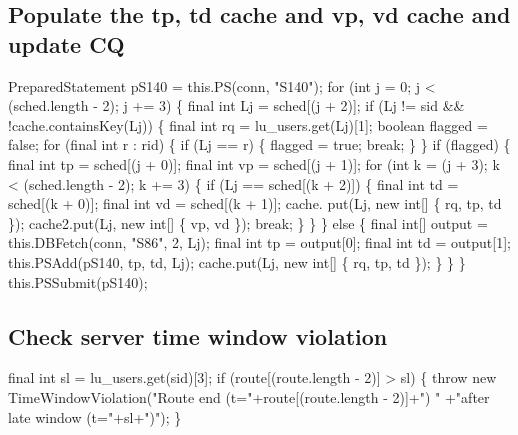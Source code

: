 \subsection{Populate the tp, td cache and vp, vd cache and update CQ}
\nwenddocs{}\endmoddef{}
PreparedStatement pS140 = this.PS(conn, "S140");
for (int j = 0; j < (sched.length - 2); j += 3) \{
  final int Lj = sched[(j + 2)];
  if (Lj != sid && !cache.containsKey(Lj)) \{
    final int rq = lu_users.get(Lj)[1];
    boolean flagged = false;
    for (final int r : rid) \{
      if (Lj == r) \{
        flagged = true;
        break;
      \}
    \}
    if (flagged) \{
      final int tp = sched[(j + 0)];
      final int vp = sched[(j + 1)];
      for (int k = (j + 3); k < (sched.length - 2); k += 3) \{
        if (Lj == sched[(k + 2)]) \{
          final int td = sched[(k + 0)];
          final int vd = sched[(k + 1)];
          cache. put(Lj, new int[] \{ rq, tp, td \});
          cache2.put(Lj, new int[] \{ vp, vd \});
          break;
        \}
      \}
    \} else \{
      final int[] output = this.DBFetch(conn, "S86", 2, Lj);
      final int tp = output[0];
      final int td = output[1];
      this.PSAdd(pS140, tp, td, Lj);
      cache.put(Lj, new int[] \{ rq, tp, td \});
    \}
  \}
\}
this.PSSubmit(pS140);
\nwendcode{}\nwdocspar

\subsection{Check server time window violation}
\nwenddocs{}\endmoddef{}
final int sl = lu_users.get(sid)[3];
if (route[(route.length - 2)] > sl) \{
  throw new TimeWindowViolation("Route end (t="+route[(route.length - 2)]+") "
      +"after late window (t="+sl+")");
\}
\nwendcode{}\nwdocspar

